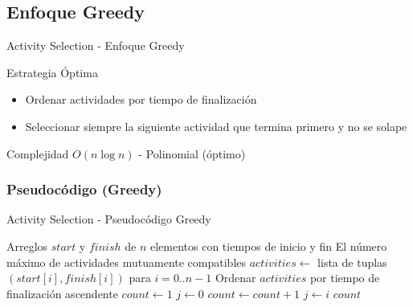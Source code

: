 \documentclass[aspectratio=169]{beamer}
\renewcommand{\algorithmicrequire}{\textbf{Entrada:}}
\renewcommand{\algorithmicensure}{\textbf{Salida:}}
\newcommand{\REQUIRE}{\State[\algorithmicrequire]}
\newcommand{\ENSURE}{\State[\algorithmicensure]}
\begin{document}
\subsection{Enfoque Greedy}
\begin{frame}{Activity Selection - Enfoque Greedy}
\begin{block}{Estrategia Óptima}
\begin{itemize}
\item Ordenar actividades por tiempo de finalización
\item Seleccionar siempre la siguiente actividad que termina primero y no se solape
\end{itemize}
\end{block}

\begin{alertblock}{Complejidad}
$O(n \log n)$ - Polinomial (óptimo)
\end{alertblock}
\end{frame}

\subsubsection{Pseudocódigo (Greedy)}
\begin{frame}[fragile]{Activity Selection - Pseudocódigo Greedy}
\scriptsize
\begin{algorithmic}[1]
\REQUIRE Arreglos $start$ y $finish$ de $n$ elementos con tiempos de inicio y fin
\ENSURE El número máximo de actividades mutuamente compatibles
\State $activities \leftarrow$ lista de tuplas $(start[i], finish[i])$ para $i=0..n-1$ 
\State Ordenar $activities$ por tiempo de finalización ascendente 
\State $count \leftarrow 1$ 
\State $j \leftarrow 0$ 
     
        \State $count \leftarrow count + 1$ 
        \State $j \leftarrow i$ 
    \EndIf
\EndFor
\Return $count$
\end{algorithmic}
\normalsize
\end{frame}
\end{document}
